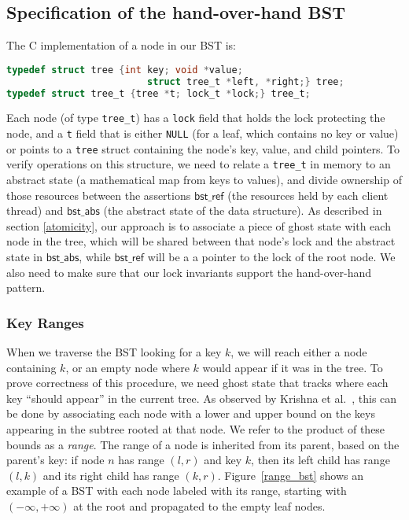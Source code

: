 \documentclass[runningheads]{llncs}
\newcommand{\treerep}{\ensuremath{\mathsf{bst\_abs}}}
\newcommand{\nodeboxrep}{\ensuremath{\mathsf{bst\_ref}}}
\begin{document}
\subsection{Specification of the hand-over-hand BST}
The C implementation of a node in our BST is:
\begin{lstlisting}[language = C,numbers = none]
typedef struct tree {int key; void *value;
                         struct tree_t *left, *right;} tree;
typedef struct tree_t {tree *t; lock_t *lock;} tree_t;
\end{lstlisting}
Each node (of type \lstinline{tree_t}) has a \lstinline{lock} field that holds the lock protecting the node, and a \lstinline{t} field that is either \lstinline{NULL} (for a leaf, which contains no key or value) or points to a \lstinline{tree} struct containing the node's key, value, and child pointers. To verify operations on this structure, we need to relate a \lstinline{tree_t} in memory to an abstract state (a mathematical map from keys to values), and divide ownership of those resources between the assertions $\nodeboxrep$ (the resources held by each client thread) and $\treerep$ (the abstract state of the data structure). As described in section \ref{atomicity}, our approach is to associate a piece of ghost state with each node in the tree, which will be shared between that node's lock and the abstract state in $\treerep$, while $\nodeboxrep$ will be a a pointer to the lock of the root node. We also need to make sure that our lock invariants support the hand-over-hand pattern.

\subsubsection{Key Ranges}%
When we traverse the BST looking for a key $k$, we will reach either a node containing $k$, or an empty node where $k$ would appear if it was in the tree. To prove correctness of this procedure, we need ghost state that tracks where each key ``should appear'' in the current tree. As observed by Krishna et al.~\cite{krishna2017flow}, this can be done by associating each node with a lower and upper bound on the keys appearing in the subtree rooted at that node. We refer to the product of these bounds as a \emph{range}. The range of a node is inherited from its parent, based on the parent's key: if node $n$ has range $(l, r)$ and key $k$, then its left child has range $(l, k)$ and its right child has range $(k, r)$. Figure~\ref{range_bst} shows an example of a BST with each node labeled with its range, starting with $(-\infty, +\infty)$ at the root and propagated to the empty leaf nodes. 
\end{document}
